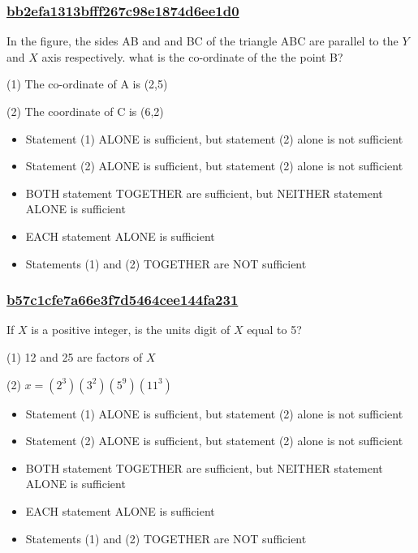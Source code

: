 \documentclass[]{beamer}
\begin{document}
\begin{frame}
    \frametitle{\underline{bb2efa1313bfff267c98e1874d6ee1d0}}
    In the figure, the sides AB and and BC of the triangle ABC are parallel to the $Y$ and $X$ axis respectively. what is the co-ordinate of the the point B?\par
(1) The co-ordinate of A is (2,5)\par
(2) The coordinate of C is (6,2)

    \begin{itemize}
        \item
            Statement (1) ALONE is sufficient, but statement (2) alone is not sufficient
        \item
            Statement (2) ALONE is sufficient, but statement (2) alone is not sufficient
        \item
            BOTH statement TOGETHER are sufficient, but NEITHER statement ALONE is sufficient
        \item
            EACH statement ALONE is sufficient
        \item
            Statements (1) and (2) TOGETHER are NOT sufficient
    \end{itemize}
\end{frame}
\begin{frame}
    \frametitle{\underline{b57c1cfe7a66e3f7d5464cee144fa231}}
    If $X$ is a positive integer, is the units digit of $X$ equal to 5?\par
(1) 12 and 25 are factors of $X$\par
(2) $x=(2^3)(3^2)(5^9)(11^3)$
    \begin{itemize}
        \item
            Statement (1) ALONE is sufficient, but statement (2) alone is not sufficient
        \item
            Statement (2) ALONE is sufficient, but statement (2) alone is not sufficient
        \item
            BOTH statement TOGETHER are sufficient, but NEITHER statement ALONE is sufficient
        \item
            EACH statement ALONE is sufficient
        \item
            Statements (1) and (2) TOGETHER are NOT sufficient
    \end{itemize}
\end{frame}
\end{document}
